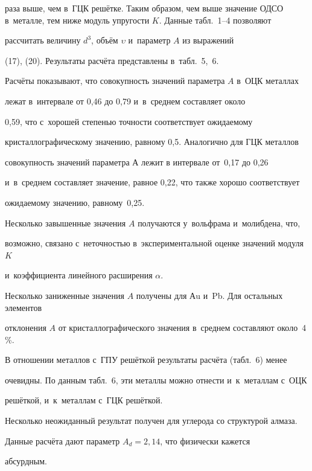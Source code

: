 раза выше, чем в~ГЦК решётке. Таким образом, чем выше значение ОДСО в~металле, тем ниже модуль упругости $K$. Данные табл.~1--4 позволяют 

рассчитать величину $d^3$, объём $\upsilon $ и~параметр $A$ из выражений 

(17), (20). Результаты расчёта представлены в~табл.~5,~6.







Расчёты показывают, что совокупность значений параметра $A$ в~ОЦК металлах 

лежат в~интервале от 0,46 до 0,79 и~в~среднем составляет около 

0,59, что с~хорошей степенью точности соответствует ожидаемому 

кристаллографическому значению, равному 0,5. Аналогично для ГЦК металлов 

совокупность значений параметра А лежит в интервале от~0,17 до 0,26 

и~в~среднем составляет значение, равное 0,22, что также хорошо соответствует 

ожидаемому значению, равному~0,25.



Несколько завышенные значения $A$ получаются у~вольфрама и~молибдена, что, 

возможно, связано с~неточностью в~экспериментальной оценке значений модуля $K$ 

и~коэффициента линейного расширения $\alpha$.



Несколько заниженные значения $A$ получены для Аu и~Pb. Для остальных элементов 

отклонения $A$ от кристаллографического значения в~среднем составляют около~4\,{\%}.





В отношении металлов с~ГПУ решёткой результаты расчёта (табл.~6) менее 

очевидны. По данным табл.~6, эти металлы можно отнести и~к~металлам с~ОЦК 

решёткой, и~к~металлам с~ГЦК решёткой.



Несколько неожиданный результат получен для углерода со структурой алмаза. 

Данные расчёта дают параметр $A_d = 2{,}14$, что физически кажется 

абсурдным.



